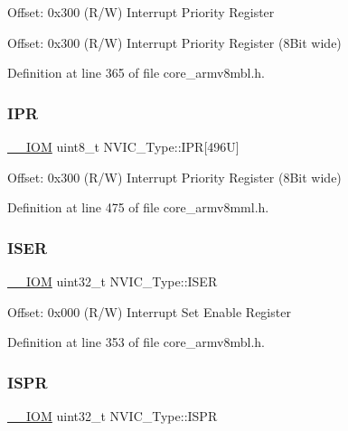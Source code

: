 Offset\+: 0x300 (R/W) Interrupt Priority Register

Offset\+: 0x300 (R/W) Interrupt Priority Register (8\+Bit wide) 

Definition at line 365 of file core\+\_\+armv8mbl.\+h.

\mbox{\label{struct_n_v_i_c___type_adfd45d2d45654c4e775017800f33e9a3}} 
\subsubsection{\texorpdfstring{I\+PR}{IPR}\hspace{0.1cm}{\footnotesize\ttfamily [2/2]}}
{\footnotesize\ttfamily \hyperlink{core__sc300_8h_ab6caba5853a60a17e8e04499b52bf691}{\+\_\+\+\_\+\+I\+OM} uint8\+\_\+t N\+V\+I\+C\+\_\+\+Type\+::\+I\+PR\mbox{[}496\+U\mbox{]}}

Offset\+: 0x300 (R/W) Interrupt Priority Register (8\+Bit wide) 

Definition at line 475 of file core\+\_\+armv8mml.\+h.

\mbox{\label{struct_n_v_i_c___type_a06726c729c5557701defc4d6b5d8f9f6}} 
\subsubsection{\texorpdfstring{I\+S\+ER}{ISER}}
{\footnotesize\ttfamily \hyperlink{core__sc300_8h_ab6caba5853a60a17e8e04499b52bf691}{\+\_\+\+\_\+\+I\+OM} uint32\+\_\+t N\+V\+I\+C\+\_\+\+Type\+::\+I\+S\+ER}

Offset\+: 0x000 (R/W) Interrupt Set Enable Register 

Definition at line 353 of file core\+\_\+armv8mbl.\+h.

\mbox{\label{struct_n_v_i_c___type_a288bc5e8b844a531a6ecdcc8dbcb8050}} 
\subsubsection{\texorpdfstring{I\+S\+PR}{ISPR}}
{\footnotesize\ttfamily \hyperlink{core__sc300_8h_ab6caba5853a60a17e8e04499b52bf691}{\+\_\+\+\_\+\+I\+OM} uint32\+\_\+t N\+V\+I\+C\+\_\+\+Type\+::\+I\+S\+PR}

